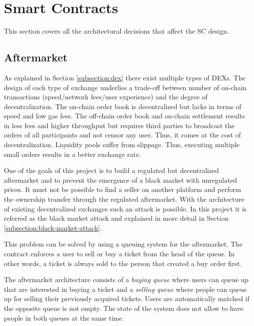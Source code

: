 
\section{Smart Contracts}\label{section:smart-contracts-design}

This section covers all the architectural decisions that affect the SC design. 

\subsection{Aftermarket}\label{section:aftermarket}
As explained in Section \ref{subsection:dex} there exist multiple types of DEXs. The design of each type of exchange underlies a trade-off between number of on-chain transactions (speed/network fees/user experience) and the degree of decentralization. The on-chain order book is decentralized but lacks in terms of speed and low gas fees. The off-chain order book and on-chain settlement results in less fees and higher throughput but requires third parties to broadcast the orders of all participants and not censor any user. Thus, it comes at the cost of decentralization. Liquidity pools suffer from slippage. Thus, executing multiple small orders results in a better exchange rate.

One of the goals of this project is to build a regulated but decentralized aftermarket and to prevent the emergence of a black market with unregulated prices. It must not be possible to find a seller on another platform and perform the ownership transfer through the regulated aftermarket. With the architecture of existing decentralized exchanges such an attack is possible. In this project it is referred as the black market attack and explained in more detail in Section \ref{subsection:black-market-attack}. 

This problem can be solved by using a queuing system for the aftermarket. The contract enforces a user to sell or buy a ticket from the head of the queue. In other words, a ticket is always sold to the person that created a buy order first. 

The aftermarket architecture consists of a \textit{buying queue} where users can queue up that are interested in buying a ticket and a \textit{selling queue} where people can queue up for selling their previously acquired tickets. Users are automatically matched if the opposite queue is not empty. The state of the system does not allow to have people in both queues at the same time. 

